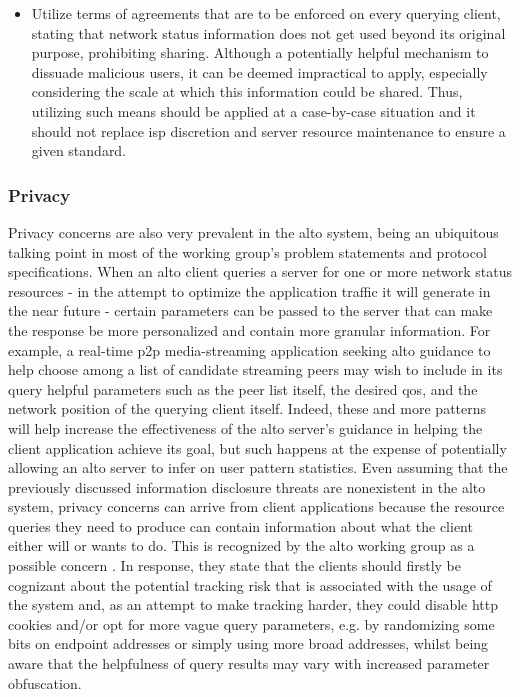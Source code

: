 \begin{itemize}
    \item Utilize terms of agreements that are to be enforced on every querying client, stating that network status information does not get used beyond its original purpose, prohibiting sharing.
        Although a potentially helpful mechanism to dissuade malicious users, it can be deemed impractical to apply, especially considering the scale at which this information could be shared.
        Thus, utilizing such means should be applied at a case-by-case situation and it should not replace \gls{isp} discretion and server resource maintenance to ensure a given standard.
\end{itemize}

\subsubsection{Privacy}%

    Privacy concerns are also very prevalent in the \gls{alto} system, being an ubiquitous talking point in most of the working group's problem statements and protocol specifications.
    When an \gls{alto} client queries a server for one or more network status resources - in the attempt to optimize the application traffic it will generate in the near future - certain parameters can be passed to the server that can make the response be more personalized and contain more granular information.
    For example, a real-time \gls{p2p} media-streaming application seeking \gls{alto} guidance to help choose among a list of candidate streaming peers may wish to include in its query helpful parameters such as the peer list itself, the desired \gls{qos}, and the network position of the querying client itself.
    Indeed, these and more patterns will help increase the effectiveness of the \gls{alto} server's guidance in helping the client application achieve its goal, but such happens at the expense of potentially allowing an \gls{alto} server to infer on user pattern statistics.
    Even assuming that the previously discussed information disclosure threats are nonexistent in the \gls{alto} system, privacy concerns can arrive from client applications because the resource queries they need to produce can contain information about what the client either will or wants to do.
    This is recognized by the \gls{alto} working group as a possible concern \cite{alto-protocol} \cite{alto-problem-statement}.
    In response, they state that the clients should firstly be cognizant about the potential tracking risk that is associated with the usage of the system and, as an attempt to make tracking harder, they could disable \gls{http} cookies and/or opt for more vague query parameters, e.g. by randomizing some bits on endpoint addresses or simply using more broad addresses, whilst being aware that the helpfulness of query results may vary with increased parameter obfuscation.

